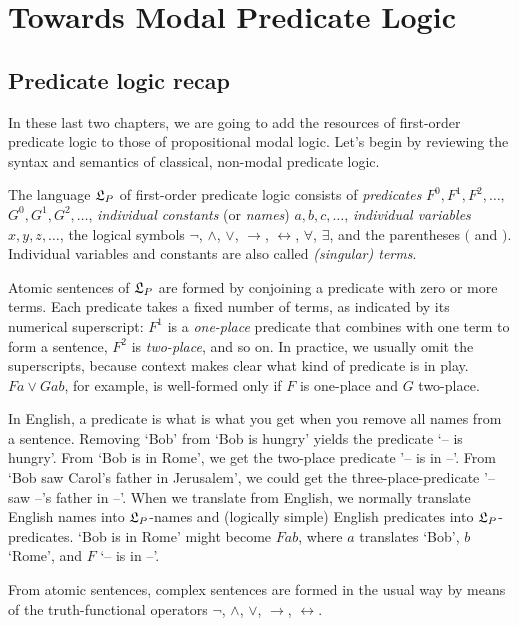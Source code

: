 \chapter{Towards Modal Predicate Logic}\label{ch:qml}


\section{Predicate logic recap}

In these last two chapters, we are going to add the resources of first-order
predicate logic to those of propositional modal logic. Let's begin by reviewing
the syntax and semantics of classical, non-modal predicate logic.

The language $\mathfrak{L}_P$ of first-order predicate logic consists of \emph{predicates}
$F^{0},F^1,F^2,\ldots,$ $G^{0},G^1,G^2,\ldots$, \emph{individual constants} (or
\emph{names}) $a,b,c,\ldots$, \emph{individual variables} $x,y,z,\ldots$, the
logical symbols $\neg$, $\land$, $\lor$, $\to$, $\leftrightarrow$, $\forall$,
$\exists$, and the parentheses $($ and $)$. Individual variables and constants
are also called \emph{(singular) terms}.

Atomic sentences of $\mathfrak{L}_{P}$ are formed by conjoining a predicate with zero or
more terms. Each predicate takes a fixed number of terms, as indicated by its
numerical superscript: $F^1$ is a \emph{one-place} predicate that combines with
one term to form a sentence, $F^2$ is \emph{two-place}, and so on. In practice,
we usually omit the superscripts, because context makes clear what kind of
predicate is in play. $Fa \lor Gab$, for example, is well-formed only if $F$ is
one-place and $G$ two-place.

In English, a predicate is what is what you get when you remove all names from a
sentence. Removing `Bob' from `Bob is hungry' yields the predicate `-- is
hungry'. From `Bob is in Rome', we get the two-place predicate '-- is in --'.
From `Bob saw Carol's father in Jerusalem', we could get the
three-place-predicate '-- saw --'s father in --'. When we translate from
English, we normally translate English names into $\mathfrak{L}_P$-names and (logically
simple) English predicates into $\mathfrak{L}_P$-predicates. `Bob is in Rome' might become
$Fab$, where $a$ translates `Bob', $b$ `Rome', and $F$ `-- is in --'.

From atomic sentences, complex sentences are formed in the usual way by means of
the truth-functional operators $\neg$, $\land$, $\lor$, $\to$,
$\leftrightarrow$.

